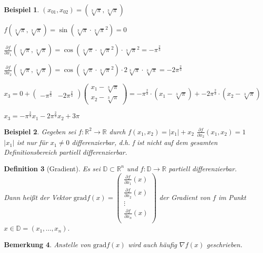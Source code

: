 \documentclass[12pt,a4paper]{scrreprt}
\newtheorem{defi}{Definition}[section]
\newtheorem{bemerkung}[defi]{Bemerkung}
\newtheorem{beispiel}[defi]{Beispiel}
\begin{document}
\begin{beispiel}
	
	$(x_{01},x_{02}) = (\sqrt[3]{\pi},\sqrt[3]{\pi})$
	
	$f(\sqrt[3]{\pi},\sqrt[3]{\pi})=\sin(\sqrt[3]{\pi}\cdot \sqrt[3]{\pi}^2) = 0$
	
	$\frac{\partial f}{\partial x_1}(\sqrt[3]{\pi},\sqrt[3]{\pi})=\cos(\sqrt[3]{\pi}\cdot \sqrt[3]{\pi}^2)\cdot \sqrt[3]{\pi}^2 = -\pi^{\frac{2}{3}}$
	
	$\frac{\partial f}{\partial x_2}(\sqrt[3]{\pi},\sqrt[3]{\pi})=\cos(\sqrt[3]{\pi}\cdot \sqrt[3]{\pi}^2)\cdot 2\sqrt[3]{\pi} \cdot \sqrt[3]{\pi} = -2\pi^{\frac{2}{3}}$
	
	$x_3 = 0 + \begin{pmatrix}-\pi^{\frac{2}{3}} & -2\pi^{\frac{2}{3}}\end{pmatrix} \begin{pmatrix}x_1 - \sqrt[3]{\pi} \\ x_2 - \sqrt[3]{\pi}\end{pmatrix} = -\pi^{\frac{2}{3}} \cdot (x_1 - \sqrt[3]{\pi}) + -2\pi^{\frac{2}{3}} \cdot (x_2 - \sqrt[3]{\pi})$
	
	$x_3 = -\pi^{\frac{2}{3}}x_1 - 2\pi^{\frac{2}{3}}x_2 + 3\pi$
\end{beispiel}

\begin{beispiel}
	Gegeben sei $f:\mathbb{R}^2\to\mathbb{R}$ durch $f(x_1,x_2)=\left| x_1 \right| + x_2$
	$\frac{\partial f}{\partial x_2}(x_1,x_2)=1$
	$\left| x_1 \right|$ ist nur für $x_1 \neq 0$ differenzierbar, d.h. f ist nicht auf dem gesamten Definitionsbereich partiell differenzierbar.
\end{beispiel}

\begin{defi}[Gradient]
	Es sei $\mathbb{D} \subset \mathbb{R}^n$ und $f:\mathbb{D} \to \mathbb{R}$ partiell differenzierbar. Dann heißt der Vektor $\mathrm{grad} f(x) = \begin{pmatrix}
	\frac{\partial f}{\partial x_1}(x) \\
	\frac{\partial f}{\partial x_2}(x) \\
	\vdots \\
	\frac{\partial f}{\partial x_n}(x) \\
	\end{pmatrix}$ der Gradient von $f$ im Punkt $x\in\mathbb{D}=(x_1,\dots,x_n)$.
\end{defi}

\begin{bemerkung}
	Anstelle von $\mathrm{grad} f(x)$ wird auch häufig $\nabla f(x)$ geschrieben.
\end{bemerkung}
\end{document}

